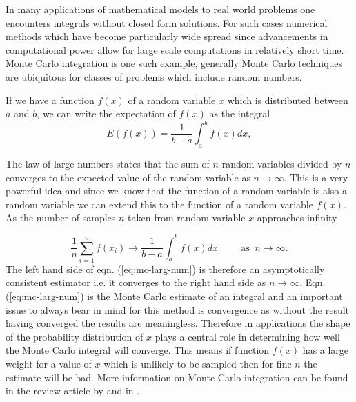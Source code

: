 In many applications of mathematical models to real world problems one encounters integrals without closed form solutions. For such cases numerical methods which have become particularly wide spread since advancements in computational power allow for large scale computations in relatively short time. Monte Carlo integration is one such example, generally Monte Carlo techniques are ubiquitous for classes of problems which include random numbers.

If we have a function $f(x)$ of a random variable $x$  which is distributed between $a$ and $b$, we can write the expectation of $f(x)$ as the integral
\begin{equation}
  \label{eq:mc-integ-def}
  E(f(x)) = \frac{1}{b-a} \int_a^b f(x) dx,
\end{equation}

The law of large numbers states that the sum of $n$ random variables divided by $n$ converges to the expected value of the random variable as $n \rightarrow \infty$. This is a very powerful idea and since we know that the function of a random variable is also a random variable we can extend this to the function of a random variable $f(x)$.  As the number of samples $n$ taken from random variable $x$ approaches infinity 

\begin{equation}
  \label{eq:mc-larg-num}
  \frac{1}{n} \sum_{i=1}^n f(x_i) \rightarrow \frac{1}{b - a}\int_a^b f(x) dx \hspace{1cm}   \text{as } \: n \rightarrow \infty.
\end{equation}
The left hand side of eqn. (\ref{eq:mc-larg-num}) is therefore an asymptotically consistent estimator i.e. it converges to the right hand side as $n \rightarrow \infty$. Eqn. (\ref{eq:mc-larg-num}) is the Monte Carlo estimate of an integral and an important issue to always bear in mind for this method is convergence as without the result having converged the results are meaningless. Therefore in applications the shape of the probability distribution of $x$ plays a central role in determining how well the Monte Carlo integral will converge. This means if function $f(x)$ has a large weight for a value of $x$ which is unlikely to be sampled then for fine $n$ the estimate will be bad. More information on Monte Carlo integration can be found in the review article by \cite{James:mc}  and in \cite[Chapter~5]{norris1998markov}. 

